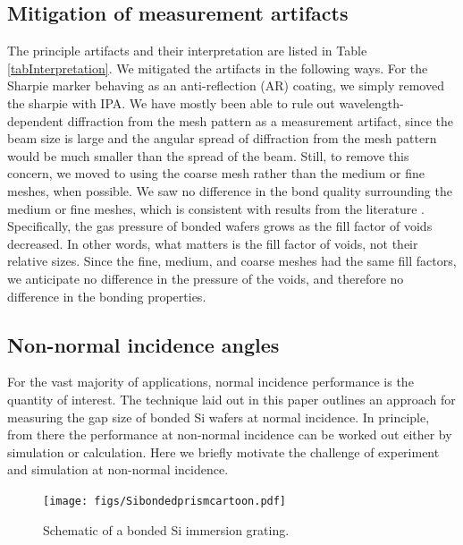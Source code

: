 \documentclass[osajnl,preprint,showpacs,superscriptaddress,12pt]{revtex4-1} %
\begin{document}
\subsection{Mitigation of measurement artifacts}
The principle artifacts and their interpretation are listed in Table \ref{tabInterpretation}.  We mitigated the artifacts in the following ways.  For the Sharpie marker behaving as an anti-reflection (AR) coating, we simply removed the sharpie with IPA.  We have mostly been able to rule out wavelength-dependent diffraction from the mesh pattern as a measurement artifact, since the beam size is large and the angular spread of diffraction from the mesh pattern would be much smaller than the spread of the beam.  Still, to remove this concern, we moved to using the coarse mesh rather than the medium or fine meshes, when possible.  We saw no difference in the bond quality surrounding the medium or fine meshes, which is consistent with results from the literature \cite{1992JEMat..21..669M}.  Specifically, the gas pressure of bonded wafers grows as the fill factor of voids decreased.  In other words, what matters is the fill factor of voids, not their relative sizes.  Since the fine, medium, and coarse meshes had the same fill factors, we anticipate no difference in the pressure of the voids, and therefore no difference in the bonding properties.

\subsection{Non-normal incidence angles}
For the vast majority of applications, normal incidence performance is the quantity of interest.  The technique laid out in this paper outlines an approach for measuring the gap size of bonded Si wafers at normal incidence.  In principle, from there the performance at non-normal incidence can be worked out either by simulation or calculation.  Here we briefly motivate the challenge of experiment and simulation at non-normal incidence.  

\begin{figure}[htbp]
\centerline{\texttt{[image: figs/Sibondedprismcartoon.pdf]}}
\caption{Schematic of a bonded Si immersion grating\label{figSiPrism}.  }
\end{figure}
\end{document}
